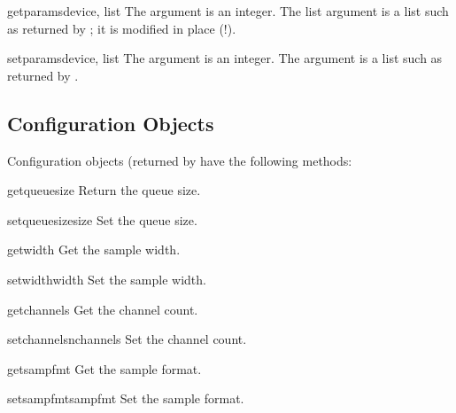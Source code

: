\begin{funcdesc}{getparams}{device, list}
The  argument is an integer.  The list argument is a list
such as returned by ; it is modified in place
(!).
\end{funcdesc}

\begin{funcdesc}{setparams}{device, list}
The  argument is an integer.  The  argument is a
list such as returned by .
\end{funcdesc}


\subsection{Configuration Objects}
\label{al-config-objects}

Configuration objects (returned by  have the
following methods:

\begin{methoddesc}{getqueuesize}{}
Return the queue size.
\end{methoddesc}

\begin{methoddesc}{setqueuesize}{size}
Set the queue size.
\end{methoddesc}

\begin{methoddesc}{getwidth}{}
Get the sample width.
\end{methoddesc}

\begin{methoddesc}{setwidth}{width}
Set the sample width.
\end{methoddesc}

\begin{methoddesc}{getchannels}{}
Get the channel count.
\end{methoddesc}

\begin{methoddesc}{setchannels}{nchannels}
Set the channel count.
\end{methoddesc}

\begin{methoddesc}{getsampfmt}{}
Get the sample format.
\end{methoddesc}

\begin{methoddesc}{setsampfmt}{sampfmt}
Set the sample format.
\end{methoddesc}

